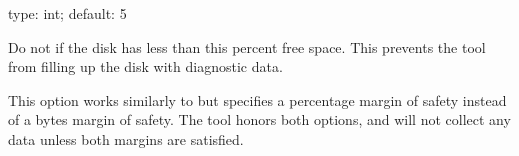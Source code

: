 \documentclass[letterpaper,10pt,english]{sphinxmanual}
\begin{document}
\begin{fulllineitems}
\label{\detokenize{mariadb-stat:cmdoption-mariadb-stat-disk-pct-free}}
\sphinxAtStartPar
type: int; default: 5

\sphinxAtStartPar
Do not {\hyperref[\detokenize{mariadb-stat:cmdoption-mariadb-stat-collect}]{}} if the disk has less than this percent free space.
This prevents the tool from filling up the disk with diagnostic data.

\sphinxAtStartPar
This option works similarly to {\hyperref[\detokenize{mariadb-stat:cmdoption-mariadb-stat-disk-bytes-free}]{}} but specifies a
percentage margin of safety instead of a bytes margin of safety.
The tool honors both options, and will not collect any data unless both
margins are satisfied.

\end{fulllineitems}

\end{document}
